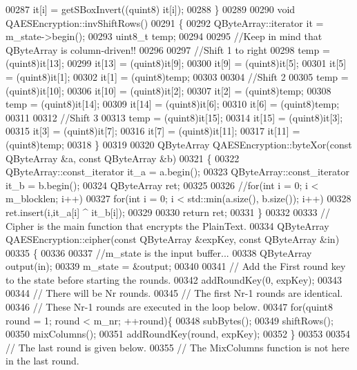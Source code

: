 \begin{DoxyCode}
00287         it[i] = getSBoxInvert((quint8) it[i]);
00288 \}
00289 
00290 \textcolor{keywordtype}{void} QAESEncryption::invShiftRows()
00291 \{
00292     QByteArray::iterator it = m\_state->begin();
00293     uint8\_t temp;
00294 
00295     \textcolor{comment}{//Keep in mind that QByteArray is column-driven!!}
00296 
00297     \textcolor{comment}{//Shift 1 to right}
00298     temp   = (quint8)it[13];
00299     it[13] = (quint8)it[9];
00300     it[9]  = (quint8)it[5];
00301     it[5]  = (quint8)it[1];
00302     it[1]  = (quint8)temp;
00303 
00304     \textcolor{comment}{//Shift 2}
00305     temp   = (quint8)it[10];
00306     it[10] = (quint8)it[2];
00307     it[2]  = (quint8)temp;
00308     temp   = (quint8)it[14];
00309     it[14] = (quint8)it[6];
00310     it[6]  = (quint8)temp;
00311 
00312     \textcolor{comment}{//Shift 3}
00313     temp   = (quint8)it[15];
00314     it[15] = (quint8)it[3];
00315     it[3]  = (quint8)it[7];
00316     it[7]  = (quint8)it[11];
00317     it[11] = (quint8)temp;
00318 \}
00319 
00320 QByteArray QAESEncryption::byteXor(\textcolor{keyword}{const} QByteArray &a, \textcolor{keyword}{const} QByteArray &b)
00321 \{
00322   QByteArray::const\_iterator it\_a = a.begin();
00323   QByteArray::const\_iterator it\_b = b.begin();
00324   QByteArray ret;
00325 
00326   \textcolor{comment}{//for(int i = 0; i < m\_blocklen; i++)}
00327   \textcolor{keywordflow}{for}(\textcolor{keywordtype}{int} i = 0; i < std::min(a.size(), b.size()); i++)
00328       ret.insert(i,it\_a[i] ^ it\_b[i]);
00329 
00330   \textcolor{keywordflow}{return} ret;
00331 \}
00332 
00333 \textcolor{comment}{// Cipher is the main function that encrypts the PlainText.}
00334 QByteArray QAESEncryption::cipher(\textcolor{keyword}{const} QByteArray &expKey, \textcolor{keyword}{const} QByteArray &in)
00335 \{
00336 
00337   \textcolor{comment}{//m\_state is the input buffer...}
00338   QByteArray output(in);
00339   m\_state = &output;
00340 
00341   \textcolor{comment}{// Add the First round key to the state before starting the rounds.}
00342   addRoundKey(0, expKey);
00343 
00344   \textcolor{comment}{// There will be Nr rounds.}
00345   \textcolor{comment}{// The first Nr-1 rounds are identical.}
00346   \textcolor{comment}{// These Nr-1 rounds are executed in the loop below.}
00347   \textcolor{keywordflow}{for}(quint8 round = 1; round < m\_nr; ++round)\{
00348     subBytes();
00349     shiftRows();
00350     mixColumns();
00351     addRoundKey(round, expKey);
00352   \}
00353 
00354   \textcolor{comment}{// The last round is given below.}
00355   \textcolor{comment}{// The MixColumns function is not here in the last round.}

\end{DoxyCode}
